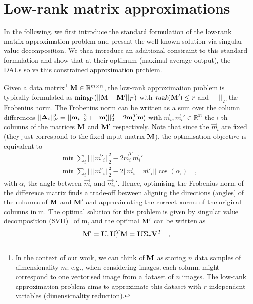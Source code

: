 \newpage
\section{Low-rank matrix approximations}
\label{sec:low_rank_matrices}
In the following, we first introduce the standard formulation of the low-rank matrix approximation problem and present the well-known solution via singular value decomposition.
We then introduce an additional constraint to this standard formulation and show that at their optimum (maximal average output), the DAUs solve this constrained approximation problem.

Given a data matrix\footnote{In the context of our work, we can think of  $\mat m$ as storing $n$ data samples of dimensionality $m$; e.g., when considering images, each column might correspond to one vectorised image from a dataset of $n$ images. The low-rank approximation problem aims to approximate this dataset with $r$ independent variables (dimensionality reduction).} $\mat M \in \mathbb R^{m\times n}$, the low-rank approximation problem is typically formulated as $\min_{\mat M'}(||\mat M-\mat M'||_F)$ with $\textit{rank}(\mat M') \leq  r$ and $||\cdot||_F$ the Frobenius norm.
The Frobenius norm can be written as 
a sum over the column differences $||\mat \Delta_i||_F^2 = ||\vec m_i||_2^2 + ||\vec m'_i||^2_2 - 2\vec m^T_i\vec m_i'$ with $\vec m_i, \vec m_i'\in\mathbb R^{m}$ the $i$-th columns of the matrices $\mat m$ and $\mat m'$ respectively.
Note that since the $\vec m_i$ are fixed (they just correspond to the fixed input matrix $\mat m$), the optimisation objective is equivalent to
\begin{align}
	\label{eq:low_r_recon}
	&\min \textstyle\sum_i ||||\vec m'_i||^2_2 - 2\vec m^T_i\vec m_i'=\\
	\label{eq:svd2}
	&\min\textstyle\sum_i ||||\vec m'_i||^2_2 - 2||\vec m_i||||\vec m'_i||\cos(\alpha_i)\quad,
\end{align}
 with $\alpha_i$ the angle between $\vec m_i$ and $\vec m_i'$. Hence, optimising the Frobenius norm of the difference matrix finds a trade-off between aligning the directions (angles) of the columns of $\mat m$ and $\mat m'$ and approximating the correct norms of the original columns in \tmat m.
The optimal solution for this problem is given by singular value decomposition (SVD)~ of \tmat m, and the optimal $\mat m'$ can be written as 
\begin{align}
\label{eq:optimal_svd}
\mat m' = \mat U_r \mat U^T_r\mat m =\mat U\mat \Sigma_r\mat v^T\quad,
\end{align}
